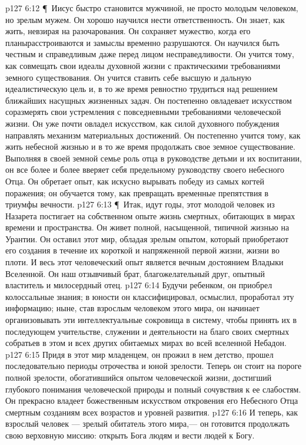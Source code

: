 \vs p127 6:12 \P\ Иисус быстро становится мужчиной, не просто молодым человеком, но зрелым мужем. Он хорошо научился нести ответственность. Он знает, как жить, невзирая на разочарования. Он сохраняет мужество, когда его планырасстроиваются и замыслы временно разрушаются. Он научился быть честным и справедливым даже перед лицом несправедливости. Он учится тому, как совмещать свои идеалы духовной жизни с практическими требованиями земного существования. Он учится ставить себе высшую и дальную идеалистическую цель и, в то же время ревностно трудиться над решением ближайших насущных жизненных задач. Он постепенно овладевает искусством соразмерять свои устремления с повседневными требованиями человеческой жизни. Он уже почти овладел искусством, как силой духовного побуждения направлять механизм материальных достижений. Он постепенно учится тому, как жить небесной жизнью и в то же время продолжать свое земное существование. Выполняя в своей земной семье роль отца в руководстве детьми и их воспитании, он все более и более вверяет себя предельному руководству своего небесного Отца. Он обретает опыт, как искусно вырывать победу из самых когтей поражения; он обучается тому, как превращать временные препятствия в триумфы вечности.
\vs p127 6:13 \P\ Итак, идут годы, этот молодой человек из Назарета постигает на собственном опыте жизнь смертных, обитающих в мирах времени и пространства. Он живет полной, насыщенной, типичной жизнью на Урантии. Он оставил этот мир, обладая зрелым опытом, который приобретают его создания в течение их короткой и напряженной первой жизни, жизни во плоти. И весь этот человеческий опыт является вечным достоянием Владыки Вселенной. Он наш отзывчивый брат, благожелательный друг, опытный властитель и милосердный отец.
\vs p127 6:14 Будучи ребенком, он приобрел колоссальные знания; в юности он классифицировал, осмыслил, проработал эту информацию; ныне, став взрослым человеком этого мира, он начинает организовывать эти интеллектуальные сокровища в систему, чтобы принять их в последующем учительстве, служении и деятельности на благо своих смертных собратьев в этом и всех других обитаемых мирах во всей вселенной Небадон.
\vs p127 6:15 Придя в этот мир младенцем, он прожил в нем детство, прошел последовательно периоды отрочества и юной зрелости. Теперь он стоит на пороге полной зрелости, обогатившийся опытом человеческой жизни, достигший глубокого понимания человеческой природы и полный сочувствия к ее слабостям. Он прекрасно владеет божественным искусством откровения его Небесного Отца смертным созданиям всех возрастов и уровней развития.
\vs p127 6:16 И теперь, как взрослый человек --- зрелый обитатель этого мира,--- он готовится продолжать свою верховную миссию: открыть Бога людям и вести людей к Богу.
